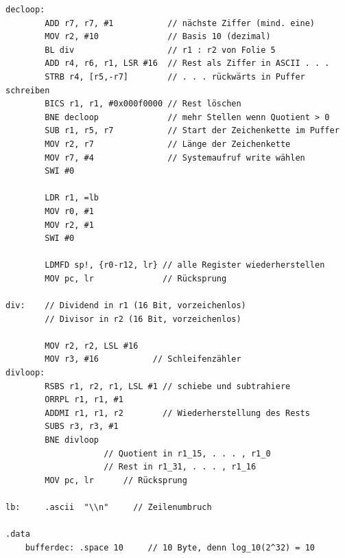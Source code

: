 \documentclass[a4paper, 11pt, onecolumn]{article}
\begin{document}
\begin{lstlisting}[basicstyle=\ttfamily\footnotesize, language={[ARM]Assembler}, caption={[Benchmark $-$ Programm zur Berechnung des Binomialkoeffizienten]}]
decloop:
        ADD r7, r7, #1           // nächste Ziffer (mind. eine)
        MOV r2, #10              // Basis 10 (dezimal)
        BL div	                 // r1 : r2 von Folie 5
        ADD r4, r6, r1, LSR #16  // Rest als Ziffer in ASCII . . .
        STRB r4, [r5,-r7]        // . . . rückwärts in Puffer schreiben
        BICS r1, r1, #0x000f0000 // Rest löschen
        BNE decloop              // mehr Stellen wenn Quotient > 0
        SUB r1, r5, r7           // Start der Zeichenkette im Puffer
        MOV r2, r7               // Länge der Zeichenkette
        MOV r7, #4               // Systemaufruf write wählen
        SWI #0

        LDR r1, =lb
        MOV r0, #1
        MOV r2, #1
        SWI #0

        LDMFD sp!, {r0-r12, lr} // alle Register wiederherstellen
        MOV pc, lr              // Rücksprung

div:    // Dividend in r1 (16 Bit, vorzeichenlos)
        // Divisor in r2 (16 Bit, vorzeichenlos)

        MOV r2, r2, LSL #16
        MOV r3, #16           // Schleifenzähler
divloop:
        RSBS r1, r2, r1, LSL #1 // schiebe und subtrahiere
        ORRPL r1, r1, #1
        ADDMI r1, r1, r2        // Wiederherstellung des Rests
        SUBS r3, r3, #1
        BNE divloop
                	// Quotient in r1_15, . . . , r1_0
                	// Rest in r1_31, . . . , r1_16
        MOV pc, lr      // Rücksprung
	
lb:     .ascii  "\\n"     // Zeilenumbruch

.data
	bufferdec: .space 10     // 10 Byte, denn log_10(2^32) = 10
\end{lstlisting}
\end{document}

